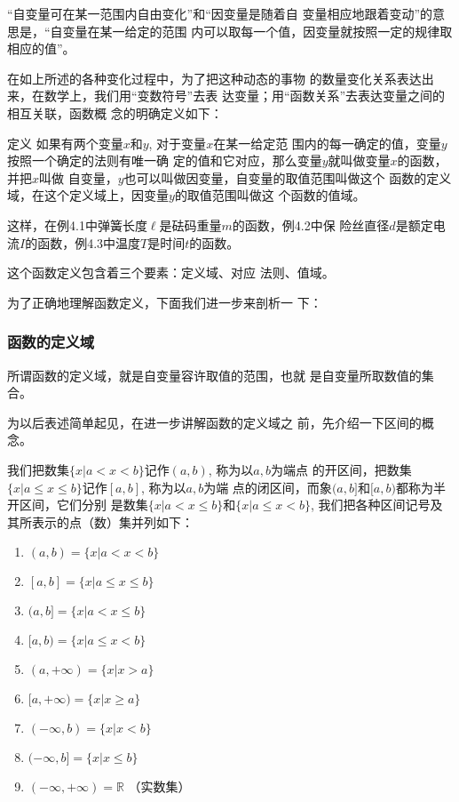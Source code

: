 “自变量可在某一范围内自由变化”和“因变量是随着自
变量相应地跟着变动”的意思是，“自变量在某一给定的范围
内可以取每一个值，因变量就按照一定的规律取相应的值”。

在如上所述的各种变化过程中，为了把这种动态的事物
的数量变化关系表达出来，在数学上，我们用“变数符号”去表
达变量；用“函数关系”去表达变量之间的相互关联，函数概
念的明确定义如下：

\begin{blk}{定义 }
    如果有两个变量$x$和$y$, 对于变量$x$在某一给定范
围内的每一确定的值，变量$y$按照一个确定的法则有唯一确
定的值和它对应，那么变量$y$就叫做变量$x$的函数，并把$x$叫做
自变量，$y$也可以叫做因变量，自变量的取值范围叫做这个
函数的定义域，在这个定义域上，因变量$y$的取值范围叫做这
个函数的值域。
\end{blk}


这样，在例4.1中弹簧长度$\ell$是砝码重量$m$的函数，例4.2中保
险丝直径$d$是额定电流$I$的函数，例4.3中温度$T$是时间$t$的函数。

这个函数定义包含着三个要素：定义域、对应
法则、值域。

为了正确地理解函数定义，下面我们进一步来剖析一
下：

\subsubsection{函数的定义域}
所谓函数的定义域，就是自变量容许取值的范围，也就
是自变量所取数值的集合。

为以后表述简单起见，在进一步讲解函数的定义域之
前，先介绍一下区间的概念。

我们把数集$\{x|a<x<b\}$记作$(a,b)$, 称为以$a,b$为端点
的开区间，把数集$\{x|a\le x\le b\}$记作$[a,b]$, 称为以$a,b$为端
点的闭区间，而象$(a,b]$和$[a,b)$都称为半开区间，它们分别
是数集$\{x|a<x\le b\}$和$\{x|a\le x<b\}$, 我们把各种区间记号及
其所表示的点（数）集并列如下：
\begin{multicols}{2}
    \begin{enumerate}
    \item $(a,b)=\{x|a<x<b\}$
    \item $ [a,b]=\{x|a\le x\le b\}$
    \item $(a,b]=\{x|a<x\le b\}$
    \item $[a,b)=\{x|a\le x<b\}$
    \item $(a,+\infty)=\{x|x>a\}$
    \item $[a,+\infty)=\{x|x\ge a\}$
    \item $(-\infty,b)=\{x|x<b\}$
    \item $(-\infty,b]=\{x|x\le b\}$
    \item $(-\infty,+\infty)=\mathbb{R}$ （实数集）
\end{enumerate}
\end{multicols}

